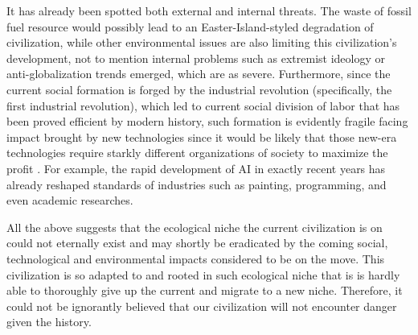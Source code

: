 \documentclass[a4paper,12pt]{article}
\begin{document}
    It has already been spotted both external and internal threats. The waste of fossil fuel resource would possibly lead to an Easter-Island-styled degradation of civilization, while other environmental issues are also limiting this civilization's development, not to mention internal problems such as extremist ideology or anti-globalization trends emerged, which are as severe.
    Furthermore, since the current social formation is forged by the industrial revolution (specifically, the first industrial revolution), which led to current social division of labor that has been proved efficient by modern history, such formation is evidently fragile facing impact brought by new technologies since it would be likely that those new-era technologies require starkly different organizations of society to maximize the profit \cite{2019_ImpactAIOnLabor}. For example, the rapid development of AI in exactly recent years has already reshaped standards of industries such as painting, programming, and even academic researches.
    
    All the above suggests that the ecological niche the current civilization is on could not eternally exist and may shortly be eradicated by the coming social, technological and environmental impacts considered to be on the move. This civilization is so adapted to and rooted in such ecological niche that is is hardly able to thoroughly give up the current and migrate to a new niche. Therefore, it could not be ignorantly believed that our civilization will not encounter danger given the history.
    
\end{document}
